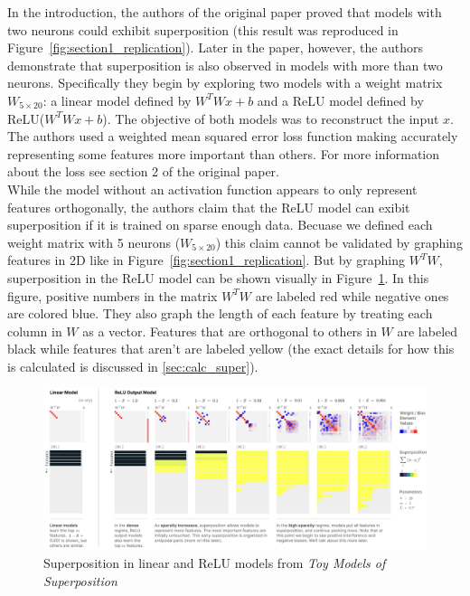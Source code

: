 \documentclass{article} %
\begin{document}
In the introduction, the authors of the original paper proved that models with 
two neurons could exhibit superposition (this result was reproduced in Figure~\ref{fig:section1_replication}).
Later in the paper, however, the authors demonstrate that superposition
is also observed in models with more than two neurons. Specifically they begin 
by exploring two models with a weight matrix $W_{5 \times 20}$: a linear model defined by 
$W^TWx + b$ and a ReLU model defined by ReLU($W^TWx + b$). The objective of both
models was to reconstruct the input $x$. The authors used a weighted mean squared
error loss function making accurately representing some features more important
than others. For more information about the loss see section 2 of the original
paper.\\

While the model without an activation function appears to only represent features
orthogonally, the authors claim that the ReLU model can exibit superposition
if it is trained on sparse enough data. Becuase we defined each weight matrix with 5 neurons ($W_{5 \times 20}$)
this claim cannot be validated by graphing features in 2D like in Figure~\ref{fig:section1_replication}. 
But by graphing $W^TW$, superposition in the ReLU model can be shown visually in Figure~\ref{fig:section3_anthropic}. 
In this figure, positive numbers in the matrix $W^TW$ are labeled red while 
negative ones are colored blue. They also graph the length of each feature by treating 
each column in $W$ as a vector. Features that are orthogonal to others in $W$ are 
labeled black while features that aren't are labeled yellow
(the exact details for how this is calculated is discussed in \ref{sec:calc_super}).\\

\begin{figure}[h]
    \centering
    \includegraphics[width=0.9\linewidth]{demonstrating_superposition/images/anthropic_section3.png}
    \captionsetup{font=footnotesize} %
    \caption{Superposition in linear and ReLU models from \textit{Toy Models of Superposition}\cite{elhage2022toy}}
    \label{fig:section3_anthropic}
\end{figure}
\end{document}
